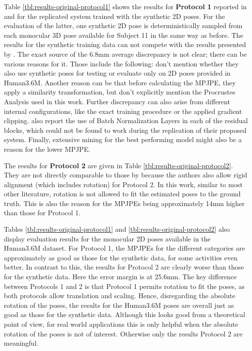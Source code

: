 



Table \ref{tbl:results-original-protocol1} shows the results for \textbf{Protocol 1} reported in \cite{drover18} and for the replicated system trained with the synthetic 2D poses.
For the evaluation of the latter, one synthetic 2D pose is deterministically sampled from each monocular 3D pose available for Subject 11 in the same way as before.
The results for the synthetic training data can not compete with the results presented by \citet{drover18}.
The exact source of the 6.8mm average discrepancy is not clear; there can be various reasons for it.
Those include the following:
\citet{drover18} don't mention whether they also use synthetic poses for testing or evaluate only on 2D poses provided in Human3.6M.
Another reason can be that before calculating the MPJPE, they apply a similarity transformation, but don't explicitly mention the Procrustes Analysis used in this work.
Further discrepancy can also arise from different internal configurations, like the exact training procedure or the applied gradient clipping.
\citet{drover18} also report the use of Batch Normalization Layers in each of the residual blocks, which could not be found to work during the replication of their proposed system.
Finally, extensive mining for the best performing model might also be a reason for the lower MPJPE.

The results for \textbf{Protocol 2} are given in Table \ref{tbl:results-original-protocol2}.
They are not directly comparable to those by \citet{drover18} because the authors also allow rigid alignment (which includes rotation) for Protocol 2.
In this work, similar to most other literature, rotation is not allowed to fit the estimated poses to the ground truth.
This is also the reason for the MPJPEs being approximately 14mm higher than those for Protocol 1.

Tables \ref{tbl:results-original-protocol1} and \ref{tbl:results-original-protocol2} also display evaluation results for the monocular 2D poses available in the Human3.6M dataset.
For Protocol 1, the MPJPEs for the different categories are approximately as good as those for the synthetic data, for some activities even better.
In contrast to this, the results for Protocol 2 are clearly worse than those for the synthetic data.
Here the error margin is at 25.6mm.
The key difference between Protocols 1 and 2 is that Protocol 1 permits rotation to fit the poses, as both protocols allow translation and scaling.
Hence, disregarding the absolute rotation of the poses, the results for the Human3.6M poses are overall just as good as those for the synthetic data.
Although this looks good from a theoretical point of view, for real world applications this is only helpful when the absolute rotation of the poses is not of interest.
Otherwise only the results Protocol 2 are meaningful.

